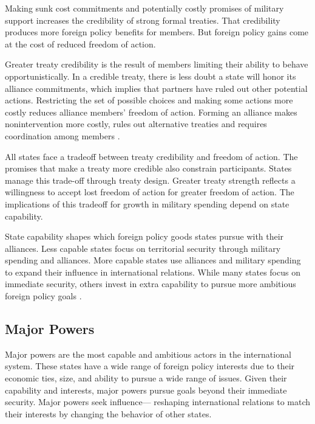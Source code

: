 \documentclass[12pt]{article}
\begin{document}
Making sunk cost commitments and potentially costly promises of military support increases the credibility of strong formal treaties.
That credibility produces more foreign policy benefits for members. 
But foreign policy gains come at the cost of reduced freedom of action. 


Greater treaty credibility is the result of members limiting their ability to behave opportunistically. 
In a credible treaty, there is less doubt a state will honor its alliance commitments, which implies that partners have ruled out other potential actions. 
Restricting the set of possible choices and making some actions more costly reduces alliance members' freedom of action. 
Forming an alliance makes nonintervention more costly, rules out alternative treaties and requires coordination among members \citep{Snyder1997}. 


All states face a tradeoff between treaty credibility and freedom of action. 
The promises that make a treaty more credible also constrain participants. 
States manage this trade-off through treaty design. 
Greater treaty strength reflects a willingness to accept lost freedom of action for greater freedom of action. 
The implications of this tradeoff for growth in military spending depend on state capability. 


State capability shapes which foreign policy goods states pursue with their alliances. 
Less capable states focus on territorial security through military spending and alliances. 
More capable states use alliances and military spending to expand their influence in international relations. 
While many states focus on immediate security, others invest in extra capability to pursue more ambitious foreign policy goals \citep{Fordham2011, MarkowitzFariss2017}. 


\subsection{Major Powers} 


Major powers are the most capable and ambitious actors in the international system. 
These states have a wide range of foreign policy interests due to their economic ties, size, and ability to pursue a wide range of issues. 
Given their capability and interests, major powers pursue goals beyond their immediate security. 
Major powers seek influence--- reshaping international relations to match their interests by changing the behavior of other states. 
\end{document}
